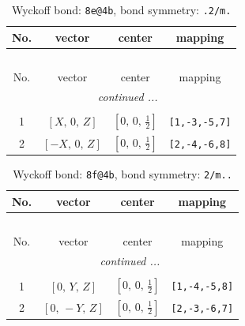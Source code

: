 \documentclass[fleqn,8pt]{jsarticle}
\begin{document}
\renewcommand{\arraystretch}{1.2}
\begin{longtable}{cccc}
\caption{Wyckoff bond: {\tt 8e@4b}, bond symmetry: {\tt .2/m.}}
 \\
 \hline \hline
No. & vector & center & mapping \\ \hline \endfirsthead

\multicolumn{3}{l}{\tablename\ \thetable{}} \\
 \hline \hline
No. & vector & center & mapping \\ \hline \endhead

 \hline \hline
\multicolumn{3}{r}{\footnotesize\it continued ...} \\ \endfoot

 \hline \hline
\multicolumn{3}{r}{} \\ \endlastfoot

1 & $\left[ X,\, 0,\, Z \right]$ & $\left[ 0,\, 0,\, \frac{1}{2} \right]$ & {\tt [1,-3,-5,7]} \\ \hline
2 & $\left[ - X,\, 0,\, Z \right]$ & $\left[ 0,\, 0,\, \frac{1}{2} \right]$ & {\tt [2,-4,-6,8]} \\
\end{longtable}
\renewcommand{\arraystretch}{1.2}
\begin{longtable}{cccc}
\caption{Wyckoff bond: {\tt 8f@4b}, bond symmetry: {\tt 2/m..}}
 \\
 \hline \hline
No. & vector & center & mapping \\ \hline \endfirsthead

\multicolumn{3}{l}{\tablename\ \thetable{}} \\
 \hline \hline
No. & vector & center & mapping \\ \hline \endhead

 \hline \hline
\multicolumn{3}{r}{\footnotesize\it continued ...} \\ \endfoot

 \hline \hline
\multicolumn{3}{r}{} \\ \endlastfoot

1 & $\left[ 0,\, Y,\, Z \right]$ & $\left[ 0,\, 0,\, \frac{1}{2} \right]$ & {\tt [1,-4,-5,8]} \\ \hline
2 & $\left[ 0,\, - Y,\, Z \right]$ & $\left[ 0,\, 0,\, \frac{1}{2} \right]$ & {\tt [2,-3,-6,7]} \\
\end{longtable}
\renewcommand{\arraystretch}{1.2}
\end{document}
